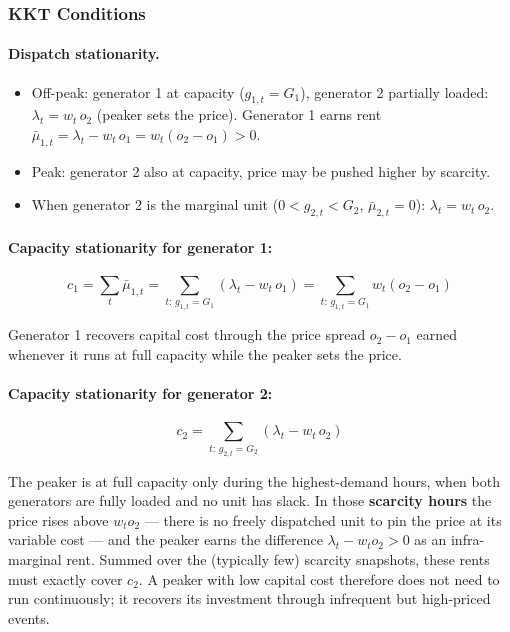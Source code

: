 \documentclass{article}
\begin{document}
\subsubsection{KKT Conditions}

\paragraph{Dispatch stationarity.}
\begin{itemize}
    \item Off-peak: generator 1 at capacity ($g_{1,t} = G_1$), generator 2 partially loaded:
          $\lambda_t = w_t\, o_2$ (peaker sets the price).
          Generator 1 earns rent $\bar{\mu}_{1,t} = \lambda_t - w_t\, o_1 = w_t(o_2 - o_1) > 0$.
    \item Peak: generator 2 also at capacity, price may be pushed higher by scarcity.
    \item When generator 2 is the marginal unit ($0 < g_{2,t} < G_2$, $\bar{\mu}_{2,t}=0$):
          $\lambda_t = w_t\, o_2$.
\end{itemize}

\paragraph{Capacity stationarity for generator 1:}
\begin{equation}
    c_1 = \sum_t \bar{\mu}_{1,t}
        = \sum_{t:\, g_{1,t} = G_1} (\lambda_t - w_t\, o_1)
        = \sum_{t:\, g_{1,t} = G_1} w_t (o_2 - o_1)
\end{equation}

Generator 1 recovers capital cost through the price spread $o_2 - o_1$
earned whenever it runs at full capacity while the peaker sets the price.

\paragraph{Capacity stationarity for generator 2:}
\begin{equation}
    c_2 = \sum_{t:\, g_{2,t} = G_2} (\lambda_t - w_t\, o_2)
\end{equation}

The peaker is at full capacity only during the highest-demand hours, when both
generators are fully loaded and no unit has slack.
In those \textbf{scarcity hours} the price rises above $w_t o_2$ --- there is no
freely dispatched unit to pin the price at its variable cost --- and the peaker
earns the difference $\lambda_t - w_t o_2 > 0$ as an infra-marginal rent.
Summed over the (typically few) scarcity snapshots, these rents must exactly
cover $c_2$. A peaker with low capital cost therefore does not need to run
continuously; it recovers its investment through infrequent but high-priced events.
\end{document}
